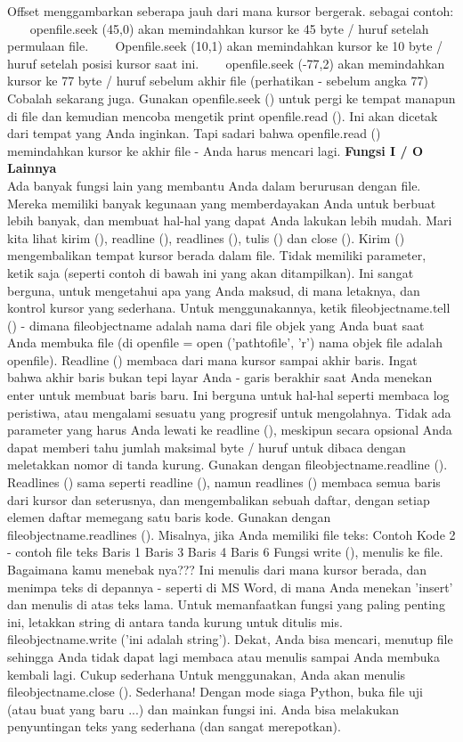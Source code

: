 Offset menggambarkan seberapa jauh dari mana kursor bergerak. sebagai contoh: 
~~~ openfile.seek (45,0) akan memindahkan kursor ke 45 byte / huruf setelah permulaan file. 
~~~ Openfile.seek (10,1) akan memindahkan kursor ke 10 byte / huruf setelah posisi kursor saat ini.  
~~~ openfile.seek (-77,2) akan memindahkan kursor ke 77 byte / huruf sebelum akhir file (perhatikan - sebelum angka 77) 
Cobalah sekarang juga. Gunakan openfile.seek () untuk pergi ke tempat manapun di file dan kemudian mencoba mengetik print openfile.read (). Ini akan dicetak dari tempat yang Anda inginkan. Tapi sadari bahwa openfile.read () memindahkan kursor ke akhir file - Anda harus mencari lagi.  
{\fontsize{14pt}{14pt}\selectfont \textbf{Fungsi I / O Lainnya} \\} 
Ada banyak fungsi lain yang membantu Anda dalam berurusan dengan file. Mereka memiliki banyak kegunaan yang memberdayakan Anda untuk berbuat lebih banyak, dan membuat hal-hal yang dapat Anda lakukan lebih mudah. Mari kita lihat kirim (), readline (), readlines (), tulis () dan close (). Kirim () mengembalikan tempat kursor berada dalam file. Tidak memiliki parameter, ketik saja (seperti contoh di bawah ini yang akan ditampilkan). Ini sangat berguna, untuk mengetahui apa yang Anda maksud, di mana letaknya, dan kontrol kursor yang sederhana. Untuk menggunakannya, ketik fileobjectname.tell () - dimana fileobjectname adalah nama dari file objek yang Anda buat saat Anda membuka file (di openfile = open ('pathtofile', 'r') nama objek file adalah openfile). Readline () membaca dari mana kursor sampai akhir baris. Ingat bahwa akhir baris bukan tepi layar Anda - garis berakhir saat Anda menekan enter untuk membuat baris baru. Ini berguna untuk hal-hal seperti membaca log peristiwa, atau mengalami sesuatu yang progresif untuk mengolahnya. Tidak ada parameter yang harus Anda lewati ke readline (), meskipun secara opsional Anda dapat memberi tahu jumlah maksimal byte / huruf untuk dibaca dengan meletakkan nomor di tanda kurung. Gunakan dengan fileobjectname.readline (). 
Readlines () sama seperti readline (), namun readlines () membaca semua baris dari kursor dan seterusnya, dan mengembalikan sebuah daftar, dengan setiap elemen daftar memegang satu baris kode. Gunakan dengan fileobjectname.readlines (). Misalnya, jika Anda memiliki file teks: 
Contoh Kode 2 - contoh file teks 
Baris 1  
Baris 3  
Baris 4  
Baris 6 
Fungsi write (), menulis ke file. Bagaimana kamu menebak nya??? Ini menulis dari mana kursor berada, dan menimpa teks di depannya - seperti di MS Word, di mana Anda menekan 'insert' dan menulis di atas teks lama. Untuk memanfaatkan fungsi yang paling penting ini, letakkan string di antara tanda kurung untuk ditulis mis. fileobjectname.write ('ini adalah string'). \hspace*{0.5in} Dekat, Anda bisa mencari, menutup file sehingga Anda tidak dapat lagi membaca atau menulis sampai Anda membuka kembali lagi. Cukup sederhana Untuk menggunakan, Anda akan menulis fileobjectname.close (). Sederhana! Dengan mode siaga Python, buka file uji (atau buat yang baru ...) dan mainkan fungsi ini. Anda bisa melakukan penyuntingan teks yang sederhana (dan sangat merepotkan). 
